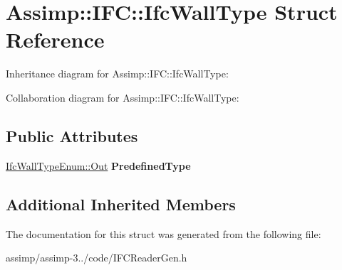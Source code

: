 \hypertarget{struct_assimp_1_1_i_f_c_1_1_ifc_wall_type}{\section{Assimp\+:\+:I\+F\+C\+:\+:Ifc\+Wall\+Type Struct Reference}
\label{struct_assimp_1_1_i_f_c_1_1_ifc_wall_type}
}


Inheritance diagram for Assimp\+:\+:I\+F\+C\+:\+:Ifc\+Wall\+Type\+:


Collaboration diagram for Assimp\+:\+:I\+F\+C\+:\+:Ifc\+Wall\+Type\+:
\subsection*{Public Attributes}
\begin{DoxyCompactItemize}
\item 
\hypertarget{struct_assimp_1_1_i_f_c_1_1_ifc_wall_type_a824051311b1daa926e127778e45c6e2f}{\hyperlink{classboost_1_1shared__ptr}{Ifc\+Wall\+Type\+Enum\+::\+Out} {\bfseries Predefined\+Type}}\label{struct_assimp_1_1_i_f_c_1_1_ifc_wall_type_a824051311b1daa926e127778e45c6e2f}

\end{DoxyCompactItemize}
\subsection*{Additional Inherited Members}


The documentation for this struct was generated from the following file\+:\begin{DoxyCompactItemize}
\item 
assimp/assimp-\/3../code/I\+F\+C\+Reader\+Gen.\+h\end{DoxyCompactItemize}
